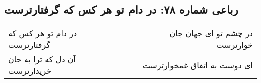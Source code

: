 \begin{center}
\section*{رباعی شماره ۷۸: در دام تو هر کس که گرفتارترست}
\label{sec:sh078}
\begin{longtable}{l p{0.5cm} r}
در دام تو هر کس که گرفتارترست
&&
در چشم تو ای جهان جان خوارترست
\\
آن دل که ترا به جان خریدارترست
&&
ای دوست به اتفاق غمخوارترست
\\
\end{longtable}
\end{center}
